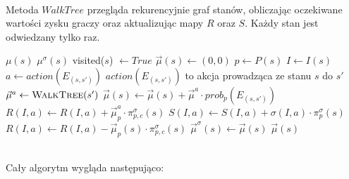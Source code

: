 \documentclass[licencjacka]{pracamgr}
\begin{document}
$\,$ \\

\noindent
Metoda $WalkTree$ przegląda rekurencyjnie graf stanów, obliczając oczekiwane wartości zysku graczy oraz
aktualizując mapy $R$ oraz $S$. Każdy stan jest odwiedzany tylko raz. \\

\begin{algorithmic}
            \State \Return $\mu(s)$
        \EndIf
            \State \Return $\mu^{\sigma}(s)$
        \EndIf
        \State visited($s$) $\gets True$
        \State $\vec{\mu}(s) \gets (0, 0)$ 
        \State $p \gets P(s)$
        \State $I \gets I(s)$
            \State $a \gets action(E_{(s, s')})$
            \Comment $action(E_{(s, s')})$ to akcja prowadząca ze stanu $s$ do $s'$
            \State $\vec{\mu}^a \gets \Call{WalkTree}{s'}$
            \State $\vec{\mu}(s) \gets \vec{\mu}(s) + \vec{\mu}^a \cdot prob_p(E_{(s, s')})$
                \State $R(I, a) \gets R(I, a) + \vec{\mu}^a_p \cdot \pi_{p,c}^{\sigma}(s)$
                \State $S(I, a) \gets S(I, a) + \sigma(I, a) \cdot \pi_p^{\sigma}(s)$
            \EndIf
        \EndFor
            \State $R(I, a) \gets R(I, a) - \vec{\mu}_p(s) \cdot \pi_{p,c}^{\sigma}(s)$
        \EndIf
        \State $\vec{\mu}^{\sigma}(s) \gets \vec{\mu}(s)$
        \State \Return $\vec{\mu}(s)$
    \EndFunction
\end{algorithmic}

$\,$ \\

\noindent
Cały algorytm wygląda następująco: \\
\end{document}
